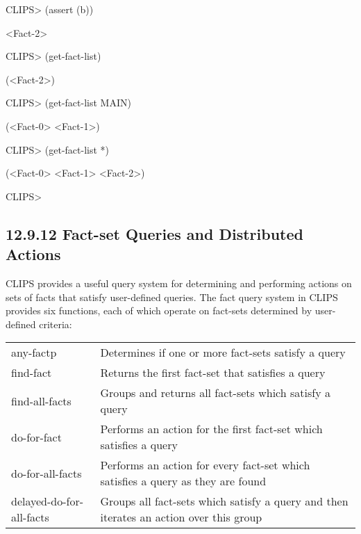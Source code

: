 \documentclass[letterpaper,10pt,english]{sphinxmanual}
\begin{document}
CLIPS\textgreater{} (assert (b))

\textless{}Fact-2\textgreater{}

CLIPS\textgreater{} (get-fact-list)

(\textless{}Fact-2\textgreater{})

CLIPS\textgreater{} (get-fact-list MAIN)

(\textless{}Fact-0\textgreater{} \textless{}Fact-1\textgreater{})

CLIPS\textgreater{} (get-fact-list *)

(\textless{}Fact-0\textgreater{} \textless{}Fact-1\textgreater{} \textless{}Fact-2\textgreater{})

CLIPS\textgreater{}


\subsection{12.9.12 Fact-set Queries and Distributed Actions}
\label{\detokenize{actions:fact-set-queries-and-distributed-actions}}
CLIPS provides a useful query system for determining and performing
actions on sets of facts that satisfy user-defined queries. The fact
query system in CLIPS provides six functions, each of which operate on
fact-sets determined by user-defined criteria:


\begin{savenotes}\sphinxattablestart
\centering
\begin{tabulary}{\linewidth}[t]{|T|T|}
\hline
\sphinxstyletheadfamily 
{}
&\sphinxstyletheadfamily 
{}
\\
\hline
any-factp
&
Determines if one or more fact-sets satisfy a query
\\
\hline
find-fact
&
Returns the first fact-set that satisfies a query
\\
\hline
find-all-facts
&
Groups and returns all fact-sets which satisfy a query
\\
\hline
do-for-fact
&
Performs an action for the first fact-set which satisfies a query
\\
\hline
do-for-all-facts
&
Performs an action for every fact-set which satisfies a query as they are found
\\
\hline
delayed-do-for-all-facts
&
Groups all fact-sets which satisfy a query and then iterates an action over this group
\\
\hline
\end{tabulary}
\par
\sphinxattableend\end{savenotes}
\end{document}
